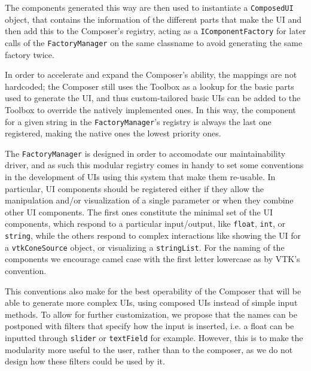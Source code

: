 The components generated this way are then used to instantiate a \verb|ComposedUI| object, that contains the information of the different parts that make the UI and then add this to the Composer's registry, acting as a \verb|IComponentFactory| for later calls of the \verb|FactoryManager| on the same classname to avoid generating the same factory twice.

In order to accelerate and expand the Composer's ability, the mappings are not hardcoded; the Composer still uses the Toolbox as a lookup for the basic parts used to generate the UI, and thus custom-tailored basic UIs can be added to the Toolbox to override the natively implemented ones. In this way, the component for a given string in the \verb|FactoryManager|'s registry is always the last one registered, making the native ones the lowest priority ones.

The \verb|FactoryManager| is designed in order to accomodate our maintainability driver, and as such this modular registry comes in handy to set some conventions in the development of UIs using this system that make them re-usable. In particular, UI components should be registered either if they allow the manipulation and/or visualization of a single parameter or when they combine other UI components. The first ones constitute the minimal set of the UI components, which respond to a particular input/output, like \verb|float|, \verb|int|, or \verb|string|, while the others respond to complex interactions like showing the UI for a \verb|vtkConeSource| object, or visualizing a \verb|stringList|. For the naming of the components we encourage camel case with the first letter lowercase as by VTK's convention. 

This conventions also make for the best operability of the Composer that will be able to generate more complex UIs, using composed UIs instead of simple input methods. To allow for further customization, we propose that the names can be postponed with filters that specify how the input is inserted, i.e. a float can be inputted through \verb|slider| or \verb|textField| for example. However, this is to make the modularity more useful to the user, rather than to the composer, as we do not design how these filters could be used by it.
